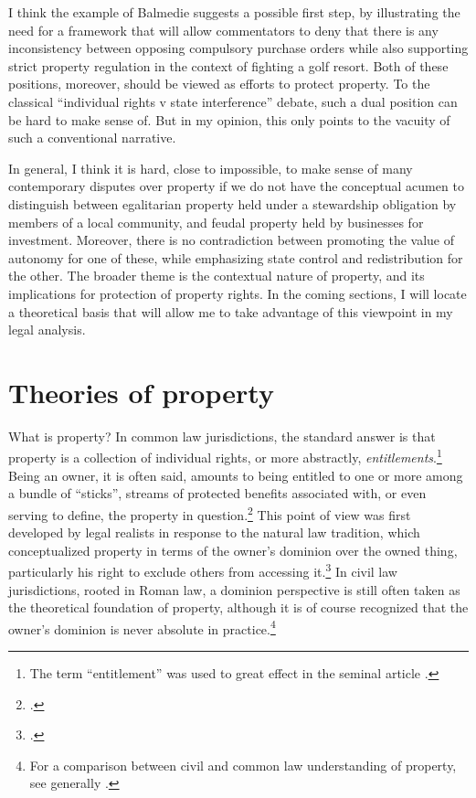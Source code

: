 I think the example of Balmedie suggests a possible first step, by illustrating the need for a framework that will allow commentators to  deny that there is any inconsistency between opposing compulsory purchase orders while also supporting strict property regulation in the context of fighting a golf resort. Both of these positions, moreover, should be viewed as efforts to protect property. To the classical ``individual rights v state interference'' debate, such a dual position can be hard to make sense of. But in my opinion, this only points to the vacuity of such a conventional narrative.

In general, I think it is hard, close to impossible, to make sense of many contemporary disputes over property if we do not have the conceptual acumen to distinguish between egalitarian property held under a stewardship obligation by members of a local community, and feudal property held by businesses for investment. Moreover, there is no contradiction between promoting the value of autonomy for one of these, while emphasizing state control and redistribution for the other. The broader theme is the contextual nature of property, and its implications for protection of property rights. In the coming sections, I will locate a theoretical basis that will allow me to take advantage of this viewpoint in my legal analysis.

\section{Theories of property}\label{sec:top}

What is property? In common law jurisdictions, the standard answer is that property is a collection of individual rights, or more abstractly, {\it entitlements}.\footnote{The term ``entitlement'' was used to great effect in the seminal article \cite{calabresi72}.} Being an owner, it is often said, amounts to being entitled to one or more among a bundle of ``sticks'', streams of protected benefits associated with, or even serving to define, the property in question.\footcite[357-358]{merrill01} This point of view was first developed by legal realists in response to the natural law tradition, which conceptualized property in terms of the owner's dominion over the owned thing, particularly his right to exclude others from accessing it.\footcite[193-195]{klein11} In civil law jurisdictions, rooted in Roman law, a dominion perspective is still often taken as the theoretical foundation of property, although it is of course recognized that the owner's dominion is never absolute in practice.\footnote{For a comparison between civil and common law understanding of property, see generally \cite{chang12}.}

